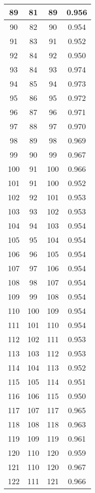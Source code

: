 \begin{table}
\begin{tabular}{|c|c|c|c|}
 89  & 81  & 89 & 0.956  \\ \hline
 90  & 82  & 90 & 0.954  \\ \hline
 91  & 83  & 91 & 0.952  \\ \hline
 92  & 84  & 92 & 0.950  \\ \hline
 93  & 84  & 93 & 0.974  \\ \hline
 94  & 85  & 94 & 0.973  \\ \hline
 95  & 86  & 95 & 0.972  \\ \hline
 96  & 87  & 96 & 0.971  \\ \hline
 97  & 88  & 97 & 0.970  \\ \hline
 98  & 89  & 98 & 0.969  \\ \hline
 99  & 90  & 99 & 0.967  \\ \hline
 100  & 91  & 100 & 0.966  \\ \hline
 101  & 91  & 100 & 0.952  \\ \hline
 102  & 92  & 101 & 0.953  \\ \hline
 103  & 93  & 102 & 0.953  \\ \hline
 104  & 94  & 103 & 0.954  \\ \hline
 105  & 95  & 104 & 0.954  \\ \hline
 106  & 96  & 105 & 0.954  \\ \hline
 107  & 97  & 106 & 0.954  \\ \hline
 108  & 98  & 107 & 0.954  \\ \hline
 109  & 99  & 108 & 0.954  \\ \hline
 110  & 100  & 109 & 0.954  \\ \hline
 111  & 101  & 110 & 0.954  \\ \hline
 112  & 102  & 111 & 0.953  \\ \hline
 113  & 103  & 112 & 0.953  \\ \hline
 114  & 104  & 113 & 0.952  \\ \hline
 115  & 105  & 114 & 0.951  \\ \hline
 116  & 106  & 115 & 0.950  \\ \hline
 117  & 107  & 117 & 0.965  \\ \hline
 118  & 108  & 118 & 0.963  \\ \hline
 119  & 109  & 119 & 0.961  \\ \hline
 120  & 110  & 120 & 0.959  \\ \hline
 121  & 110  & 120 & 0.967  \\ \hline
 122  & 111  & 121 & 0.966  \\ \hline

\end{tabular}
\end{table}
